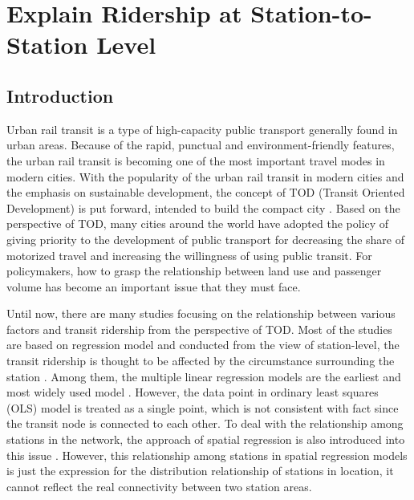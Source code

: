\chapter{Explain Ridership at Station-to-Station Level}
%
\section{Introduction}
%
Urban rail transit is a type of high-capacity public transport generally found in urban areas. Because of the rapid, punctual and environment-friendly features, the urban rail transit is becoming one of the most important travel modes in modern cities. With the popularity of the urban rail transit in modern cities and the emphasis on sustainable development, the concept of TOD (Transit Oriented Development) is put forward, intended to build the compact city \cite{calthorpe1993next}. Based on the perspective of TOD, many cities around the world have adopted the policy of giving priority to the development of public transport for decreasing the share of motorized travel and increasing the willingness of using public transit. For policymakers, how to grasp the relationship between land use and passenger volume has become an important issue that they must face.

%
Until now, there are many studies focusing on the relationship between various factors and transit ridership from the perspective of TOD. Most of the studies are based on regression model and conducted from the view of station-level, the transit ridership is thought to be affected by the circumstance surrounding the station \cite{cervero1997travel,taylor2003analyzing,zhao2005transit,estupinan2008relationship,taylor2009nature,sohn2010factors,gutierrez2011transit,jun2015land}. Among them, the multiple linear regression models are the earliest and most widely used model \cite{cervero1997travel,gutierrez2011transit}. However, the data point in ordinary least squares (OLS) model is treated as a single point, which is not consistent with fact since the transit node is connected to each other. To deal with the relationship among stations in the network, the approach of spatial regression is also introduced into this issue \cite{cardozo2012application,jun2015land}. However, this relationship among stations in spatial regression models is just the expression for the distribution relationship of stations in location, it cannot reflect the real connectivity between two station areas.

